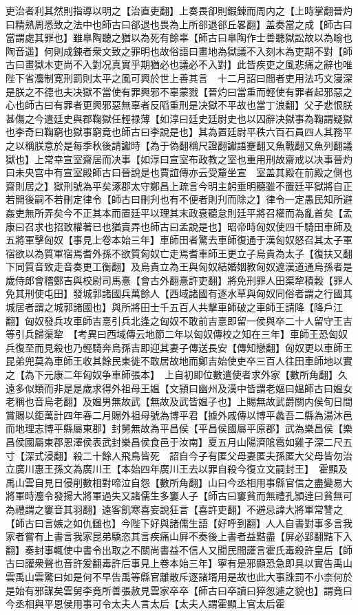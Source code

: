 吏治者利其然則指導以明之【治直吏翻】上奏畏卻則鍜鍊而周内之【上時掌翻晉灼曰精熟周悉致之法中也師古曰郤退也畏為上所郤退郤丘畧翻】盖奏當之成【師古曰當謂處其罪也】雖臯陶聽之猶以為死有餘辜【師古曰臯陶作士善聽獄訟故以為喻也陶音遥】何則成鍊者衆文致之罪明也故俗語曰畫地為獄議不入刻木為吏期不對【師古曰畫獄木吏尚不入對况真實乎期猶必也議必不入對】此皆疾吏之風悲痛之辭也唯陛下省灋制寛刑罰則太平之風可興於世上善其言　十二月詔曰間者吏用法巧文寖深是朕之不德也夫决獄不當使有罪興邪不辜蒙戮【晉灼曰當重而輕使有罪者起邪惡之心也師古曰有罪者更興邪惡無辜者反䧟重刑是决獄不平故也當丁浪翻】父子悲恨朕甚傷之今遣廷史與郡鞠獄任輕禄薄【如淳曰廷史廷尉史也以囚辭决獄事為鞠謂疑獄也李奇曰鞠窮也獄事窮竟也師古曰李說是也】其為置廷尉平秩六百石員四人其務平之以稱朕意於是每季秋後請讞時【為于偽翻稱尺證翻讞語蹇翻又魚戰翻又魚列翻議獄也】上常幸宣室齋居而决事【如淳曰宣室布政教之室也重用刑故齋戒以决事晉灼曰未央宫中有宣室殿師古曰晉說是也賈誼傳亦云受釐坐宣　室盖其殿在前殿之側也齋則居之】獄刑號為平矣涿郡太守鄭昌上疏言今明主躬垂明聽雖不置廷平獄將自正若開後嗣不若刪定律令【師古曰刪刋也有不便者則刋而除之】律令一定愚民知所避姦吏無所弄矣今不正其本而置廷平以理其末政衰聽怠則廷平將召權而為亂首矣【孟康曰召求也招致權著已也猶賣弄也師古曰孟說是也】昭帝時匈奴使四千騎田車師及五將軍擊匈奴【事見上卷本始三年】車師田者驚去車師復通于漢匈奴怒召其太子軍宿欲以為質軍宿焉耆外孫不欲質匈奴亡走焉耆車師王更立子烏貴為太子【復扶又翻下同質音致走音奏更工衡翻】及烏貴立為王與匈奴結婚姻教匈奴遮漢道通烏孫者是歲侍郎會稽鄭吉與校尉司馬憙【會古外翻憙許吏翻】將免刑罪人田渠犂積穀【罪人免其刑使屯田】發城郭諸國兵萬餘人【西域諸國有逐水草與匈奴同俗者謂之行國其城居者謂之城郭諸國也】與所將田士千五百人共擊車師破之車師王請降【降戶江翻】匈奴發兵攻車師吉憙引兵北逢之匈奴不敢前吉憙即留一侯與卒二十人留守王吉等引兵歸渠犂　【考異曰西域傳云地節二年以匈奴傳校之知在三年】車師王恐匈奴兵復至而見殺也乃輕騎奔烏孫吉即迎其妻子傳送長安【傳知戀翻】匈奴更以車師王昆弟兜莫為車師王收其餘民東徙不敢居故地而鄭吉始使吏卒三百人往田車師地以實之【為下元康二年匈奴争車師張本】　上自初即位數遣使者求外家【數所角翻】久遠多似類而非是是歲求得外祖母王媪【文頴曰幽州及漢中皆謂老嫗曰媪師古曰媪女老稱也音烏老翻】及媪男無故武【無故及武皆媪子也】上賜無故武爵關内侯旬日間賞賜以鉅萬計四年春二月賜外祖母號為博平君【據外戚傳以博平蠡吾二縣為湯沐邑而地理志博平縣屬東郡】封舅無故為平昌侯【平昌侯國屬平原郡】武為樂昌侯【樂昌侯國屬東郡恩澤侯表武封樂昌侯食邑于汝南】夏五月山陽濟隂雹如雞子深二尺五寸【深式浸翻】殺二十餘人飛鳥皆死　詔自今子有匿父母妻匿夫孫匿大父母皆勿治　立廣川惠王孫文為廣川王【本始四年廣川王去以罪自殺今復立文嗣封王】　霍顯及禹山雲自見日侵削數相對啼泣自怨【數所角翻】山曰今丞相用事縣官信之盡變易大將軍時灋令發揚大將軍過失又諸儒生多窶人子【師古曰窶貧而無禮孔頴逹曰貧無可為禮謂之窶音其羽翻】遠客飢寒喜妄說狂言【喜許吏翻】不避忌諱大將軍常讐之【師古曰言嫉之如仇讎也】今陛下好與諸儒生語【好呼到翻】人人自書對事多言我家者嘗有上書言我家昆弟驕恣其言疾痛山屛不奏後上書者益黠盡【屏必郢翻黠下入翻】奏封事輒使中書令出取之不關尚書益不信人又聞民間讙言霍氏毒殺許皇后【師古曰讙衆聲也音許爰翻毒許后事見上卷本始三年】寧有是邪顯恐急即具以實告禹山雲禹山雲驚曰如是何不早告禹等縣官離散斥逐諸壻用是故也此大事誅罰不小柰何於是始有邪謀矣雲舅李竟所善張赦見雲家卒卒【師古曰卒讀曰猝怱遽之貌也】謂竟曰今丞相與平恩侯用事可令太夫人言太后【太夫人謂霍顯上官太后霍
